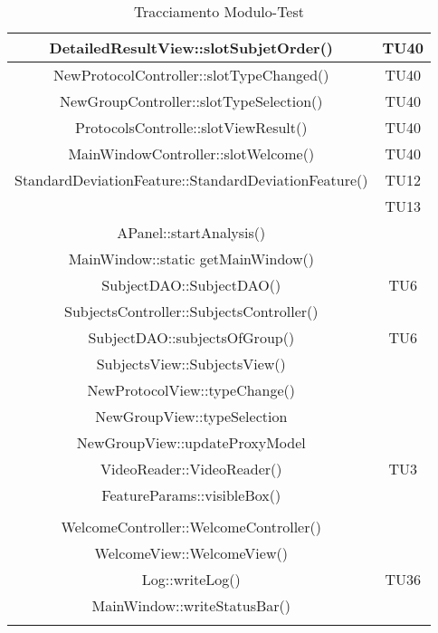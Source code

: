 \begin{center}
\begin{longtable}{|c|c|}
\hline 
DetailedResultView::slotSubjetOrder() & TU40 \\
\hline 
NewProtocolController::slotTypeChanged() & TU40 \\
\hline 
NewGroupController::slotTypeSelection() & TU40 \\
\hline 
ProtocolsControlle::slotViewResult() & TU40 \\
\hline 
MainWindowController::slotWelcome() & TU40 \\
\hline 
StandardDeviationFeature::StandardDeviationFeature() & TU12 \\
 & TU13 \\
\hline 
APanel::startAnalysis() &  \\
\hline 
MainWindow::static getMainWindow() &  \\
\hline 
SubjectDAO::SubjectDAO() & TU6 \\
\hline 
SubjectsController::SubjectsController() &  \\
\hline 
SubjectDAO::subjectsOfGroup() & TU6 \\
\hline 
SubjectsView::SubjectsView() &  \\
\hline 
NewProtocolView::typeChange() &  \\
\hline 
NewGroupView::typeSelection &  \\
\hline 
NewGroupView::updateProxyModel &  \\
\hline 
VideoReader::VideoReader() & TU3 \\
\hline 
FeatureParams::visibleBox() &  \\
 &  \\
\hline 
WelcomeController::WelcomeController() &  \\
\hline 
WelcomeView::WelcomeView() &  \\
\hline 
Log::writeLog() & TU36 \\
\hline 
MainWindow::writeStatusBar() &  \\
\hline
\caption{Tracciamento Modulo-Test}
\end{longtable}
\end{center}
